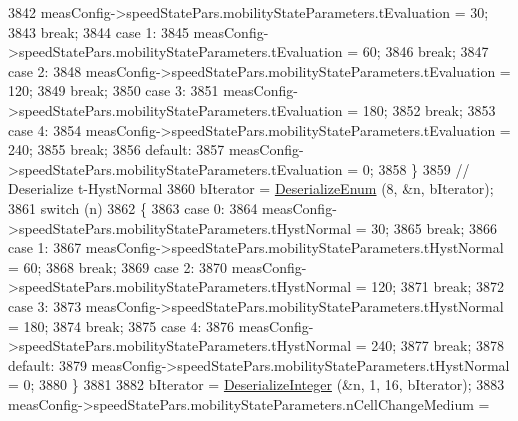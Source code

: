 \begin{DoxyCode}
3842               measConfig->speedStatePars.mobilityStateParameters.tEvaluation = 30;
3843               \textcolor{keywordflow}{break};
3844             \textcolor{keywordflow}{case} 1:
3845               measConfig->speedStatePars.mobilityStateParameters.tEvaluation = 60;
3846               \textcolor{keywordflow}{break};
3847             \textcolor{keywordflow}{case} 2:
3848               measConfig->speedStatePars.mobilityStateParameters.tEvaluation = 120;
3849               \textcolor{keywordflow}{break};
3850             \textcolor{keywordflow}{case} 3:
3851               measConfig->speedStatePars.mobilityStateParameters.tEvaluation = 180;
3852               \textcolor{keywordflow}{break};
3853             \textcolor{keywordflow}{case} 4:
3854               measConfig->speedStatePars.mobilityStateParameters.tEvaluation = 240;
3855               \textcolor{keywordflow}{break};
3856             \textcolor{keywordflow}{default}:
3857               measConfig->speedStatePars.mobilityStateParameters.tEvaluation = 0;
3858             \}
3859           \textcolor{comment}{// Deserialize t-HystNormal}
3860           bIterator = \hyperlink{classns3_1_1Asn1Header_a4fcc253e0eec3483c775b005c1875f2d}{DeserializeEnum} (8, &n, bIterator);
3861           \textcolor{keywordflow}{switch} (n)
3862             \{
3863             \textcolor{keywordflow}{case} 0:
3864               measConfig->speedStatePars.mobilityStateParameters.tHystNormal = 30;
3865               \textcolor{keywordflow}{break};
3866             \textcolor{keywordflow}{case} 1:
3867               measConfig->speedStatePars.mobilityStateParameters.tHystNormal = 60;
3868               \textcolor{keywordflow}{break};
3869             \textcolor{keywordflow}{case} 2:
3870               measConfig->speedStatePars.mobilityStateParameters.tHystNormal = 120;
3871               \textcolor{keywordflow}{break};
3872             \textcolor{keywordflow}{case} 3:
3873               measConfig->speedStatePars.mobilityStateParameters.tHystNormal = 180;
3874               \textcolor{keywordflow}{break};
3875             \textcolor{keywordflow}{case} 4:
3876               measConfig->speedStatePars.mobilityStateParameters.tHystNormal = 240;
3877               \textcolor{keywordflow}{break};
3878             \textcolor{keywordflow}{default}:
3879               measConfig->speedStatePars.mobilityStateParameters.tHystNormal = 0;
3880             \}
3881 
3882           bIterator = \hyperlink{classns3_1_1Asn1Header_a49802c9af30018b078150e866b6ecae2}{DeserializeInteger} (&n, 1, 16, bIterator);
3883           measConfig->speedStatePars.mobilityStateParameters.nCellChangeMedium = 

\end{DoxyCode}

